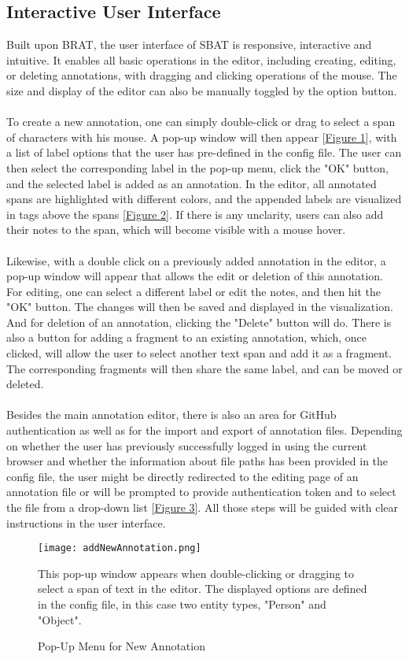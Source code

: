 \documentclass[12ptm a4paper]{article}
\begin{document}
\subsection{Interactive User Interface}
Built upon BRAT, the user interface of SBAT is responsive, interactive and intuitive. It enables all basic operations in the editor, including creating, editing, or deleting annotations, with dragging and clicking operations of the mouse. The size and display of the editor can also be manually toggled by the option button.\\
\\
To create a new annotation, one can simply double-click or drag to select a span of characters with his mouse. A pop-up window will then appear [\hyperref[figure1]{Figure 1}], with a list of label options that the user has pre-defined in the config file. The user can then select the corresponding label in the pop-up menu, click the "OK" button, and the selected label is added as an annotation. In the editor, all annotated spans are highlighted with different colors, and the appended labels are visualized in tags above the spans [\hyperref[figure2]{Figure 2}]. If there is any unclarity, users can also add their notes to the span, which will become visible with a mouse hover.\\
\\
Likewise, with a double click on a previously added annotation in the editor, a pop-up window will appear that allows the edit or deletion of this annotation. For editing, one can select a different label or edit the notes, and then hit the "OK" button. The changes will then be saved and displayed in the visualization. And for deletion of an annotation, clicking the "Delete" button will do. There is also a button for adding a fragment to an existing annotation, which, once clicked, will allow the user to select another text span and add it as a fragment. The corresponding fragments will then share the same label, and can be moved or deleted.\\
\\
Besides the main annotation editor, there is also an area for GitHub authentication as well as for the import and export of annotation files. Depending on whether the user has previously successfully logged in using the current browser and whether the information about file paths has been provided in the config file, the user might be directly redirected to the editing page of an annotation file or will be prompted to provide authentication token and to select the file from a drop-down list [\hyperref[figure3]{Figure 3}]. All those steps will be guided with clear instructions in the user interface.
\begin{figure}[H]
{\centering
\texttt{[image: addNewAnnotation.png]}
\label{figure1}
\caption{Pop-Up Menu for New Annotation}
}
{\scriptsize This pop-up window appears when double-clicking or dragging to select a span of text in the editor. The displayed options are defined in the config file, in this case two entity types, "Person" and "Object".\par} 
\end{figure}
\end{document}
